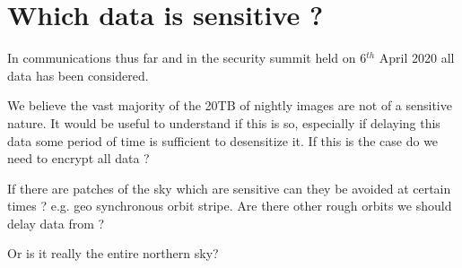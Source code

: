 \section{Which data is sensitive ?} \label{sec:which}

In communications thus far and in the security summit held on 6$^{th}$ April 2020 all data has been considered.

We believe the vast majority of the 20TB of nightly images are not of a sensitive nature.
It would be useful to understand if this is so, especially if delaying this data some period of time is sufficient to desensitize it. If this is the case do we need to encrypt all data ?

If there are patches of the sky which are sensitive can they be avoided at certain times ? e.g. geo synchronous orbit stripe.
Are there other rough orbits we should delay data from ?

Or is it really the entire northern sky?

